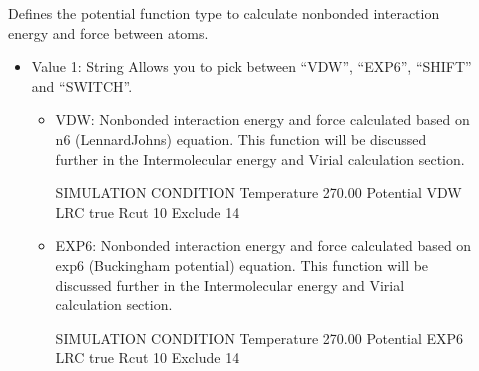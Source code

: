 \documentclass[letterpaper,10pt,english]{sphinxmanual}
\begin{document}
\begin{description}
\item[{}] \leavevmode
\sphinxAtStartPar
Defines the potential function type to calculate non\sphinxhyphen{}bonded interaction energy and force between atoms.
\begin{itemize}
\item {} 
\sphinxAtStartPar
Value 1: String \sphinxhyphen{} Allows you to pick between “VDW”, “EXP6”, “SHIFT” and “SWITCH”.
\begin{itemize}
\item {} 
\sphinxAtStartPar
VDW: Nonbonded interaction energy and force calculated based on n\sphinxhyphen{}6 (Lennard\sphinxhyphen{}Johns) equation. This function will be discussed further in the Intermolecular energy and Virial calculation section.

\begin{sphinxVerbatim}[commandchars=\\\{\}]
\PYGZsh{}\PYGZsh{}\PYGZsh{}\PYGZsh{}\PYGZsh{}\PYGZsh{}\PYGZsh{}\PYGZsh{}\PYGZsh{}\PYGZsh{}\PYGZsh{}\PYGZsh{}\PYGZsh{}\PYGZsh{}\PYGZsh{}\PYGZsh{}\PYGZsh{}\PYGZsh{}\PYGZsh{}\PYGZsh{}\PYGZsh{}\PYGZsh{}\PYGZsh{}\PYGZsh{}\PYGZsh{}\PYGZsh{}\PYGZsh{}\PYGZsh{}\PYGZsh{}\PYGZsh{}\PYGZsh{}\PYGZsh{}\PYGZsh{}
\PYGZsh{} SIMULATION CONDITION
\PYGZsh{}\PYGZsh{}\PYGZsh{}\PYGZsh{}\PYGZsh{}\PYGZsh{}\PYGZsh{}\PYGZsh{}\PYGZsh{}\PYGZsh{}\PYGZsh{}\PYGZsh{}\PYGZsh{}\PYGZsh{}\PYGZsh{}\PYGZsh{}\PYGZsh{}\PYGZsh{}\PYGZsh{}\PYGZsh{}\PYGZsh{}\PYGZsh{}\PYGZsh{}\PYGZsh{}\PYGZsh{}\PYGZsh{}\PYGZsh{}\PYGZsh{}\PYGZsh{}\PYGZsh{}\PYGZsh{}\PYGZsh{}\PYGZsh{}
Temperature   270.00
Potential     VDW
LRC           true
Rcut          10
Exclude       1\PYGZhy{}4
\end{sphinxVerbatim}

\item {} 
\sphinxAtStartPar
EXP6: Nonbonded interaction energy and force calculated based on exp\sphinxhyphen{}6 (Buckingham potential) equation. This function will be discussed further in the Intermolecular energy and Virial calculation section.

\begin{sphinxVerbatim}[commandchars=\\\{\}]
\PYGZsh{}\PYGZsh{}\PYGZsh{}\PYGZsh{}\PYGZsh{}\PYGZsh{}\PYGZsh{}\PYGZsh{}\PYGZsh{}\PYGZsh{}\PYGZsh{}\PYGZsh{}\PYGZsh{}\PYGZsh{}\PYGZsh{}\PYGZsh{}\PYGZsh{}\PYGZsh{}\PYGZsh{}\PYGZsh{}\PYGZsh{}\PYGZsh{}\PYGZsh{}\PYGZsh{}\PYGZsh{}\PYGZsh{}\PYGZsh{}\PYGZsh{}\PYGZsh{}\PYGZsh{}\PYGZsh{}\PYGZsh{}\PYGZsh{}
\PYGZsh{} SIMULATION CONDITION
\PYGZsh{}\PYGZsh{}\PYGZsh{}\PYGZsh{}\PYGZsh{}\PYGZsh{}\PYGZsh{}\PYGZsh{}\PYGZsh{}\PYGZsh{}\PYGZsh{}\PYGZsh{}\PYGZsh{}\PYGZsh{}\PYGZsh{}\PYGZsh{}\PYGZsh{}\PYGZsh{}\PYGZsh{}\PYGZsh{}\PYGZsh{}\PYGZsh{}\PYGZsh{}\PYGZsh{}\PYGZsh{}\PYGZsh{}\PYGZsh{}\PYGZsh{}\PYGZsh{}\PYGZsh{}\PYGZsh{}\PYGZsh{}\PYGZsh{}
Temperature   270.00
Potential     EXP6
LRC           true
Rcut          10
Exclude       1\PYGZhy{}4
\end{sphinxVerbatim}


\end{itemize}
\end{itemize}
\end{description}
\end{document}
